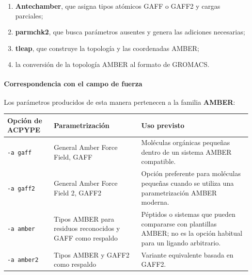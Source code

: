 \documentclass[
  spanish,
  11pt,
  a4paper]{article}
\newcounter{none} %
\providecommand{\tightlist}{%
  \setlength{\itemsep}{0pt}\setlength{\parskip}{0pt}}
\begin{document}
\begin{enumerate}
\def\labelenumi{\arabic{enumi}.}
\tightlist
\item
  \textbf{Antechamber}, que asigna tipos atómicos GAFF o GAFF2 y cargas
  parciales;
\item
  \textbf{parmchk2}, que busca parámetros ausentes y genera las
  adiciones necesarias;
\item
  \textbf{tleap}, que construye la topología y las coordenadas AMBER;
\item
  la conversión de la topología AMBER al formato de GROMACS.
\end{enumerate}

\paragraph{Correspondencia con el campo de
fuerza}\label{correspondencia-con-el-campo-de-fuerza}

Los parámetros producidos de esta manera pertenecen a la familia
\textbf{AMBER}:

{\def\LTcaptype{none} %
\begin{longtable}[]{@{}
  >{\raggedright\arraybackslash}p{}
  >{\raggedright\arraybackslash}p{}
  >{\raggedright\arraybackslash}p{}@{}}
\toprule\noalign{}
\begin{minipage}[b]{\linewidth}\raggedright
Opción de ACPYPE
\end{minipage} & \begin{minipage}[b]{\linewidth}\raggedright
Parametrización
\end{minipage} & \begin{minipage}[b]{\linewidth}\raggedright
Uso previsto
\end{minipage} \\
\midrule\noalign{}
\endhead
\bottomrule\noalign{}
\endlastfoot
\texttt{-a\ gaff} & General Amber Force Field, GAFF & Moléculas
orgánicas pequeñas dentro de un sistema AMBER compatible. \\
\texttt{-a\ gaff2} & General Amber Force Field 2, GAFF2 & Opción
preferente para moléculas pequeñas cuando se utiliza una parametrización
AMBER moderna. \\
\texttt{-a\ amber} & Tipos AMBER para residuos reconocidos y GAFF como
respaldo & Péptidos o sistemas que pueden compararse con plantillas
AMBER; no es la opción habitual para un ligando arbitrario. \\
\texttt{-a\ amber2} & Tipos AMBER y GAFF2 como respaldo & Variante
equivalente basada en GAFF2. \\
\end{longtable}
}
\end{document}
